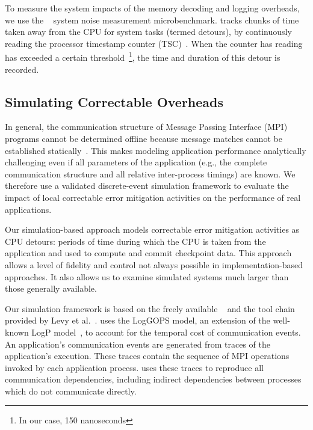To measure the system impacts of the memory decoding and logging overheads, we
use the \selfish~\cite{Hoefler:2010:Characterizing} system noise measurement
microbenchmark. \selfish tracks chunks of time taken away from the CPU for
system tasks (termed detours), by continuously reading the processor timestamp
counter (TSC)~\cite{IntelGuide}.  When the counter has reading has exceeded a
certain threshold~\footnote{In our case, 150 nanoseconds}, the time and duration
of this detour is recorded.

\subsection{Simulating Correctable Overheads}

In general, the communication structure of Message Passing Interface (MPI)
programs cannot be determined offline because message matches cannot be
established statically~\cite{bronevetsky2009communication}.  This makes
modeling application performance analytically challenging even if all
parameters of the application (e.g., the complete communication structure and
all relative inter-process timings) are known.  We therefore use a validated
discrete-event simulation framework to evaluate the impact of local
correctable error mitigation activities on the performance of real applications.

Our simulation-based approach models correctable error mitigation activities as
CPU detours: periods of time during which the CPU is taken from the application
and used to compute and commit checkpoint data.  This approach allows a level of
fidelity and control not always possible in implementation-based approaches. It
also allows us to examine simulated systems much larger than those generally
available.

Our simulation framework is based on the freely available
\LogGOPSim~\cite{Hoefler:2010:LogGOPSim} and the tool chain provided  by Levy et
al.~\cite{Levy2013UsingSimulation}.  \LogGOPSim uses the LogGOPS model, an
extension of the well-known LogP model~\cite{Culler:1993:LogP}, to account for
the temporal cost of communication events.  An application's communication
events are generated from traces of the application's execution.  These traces
contain the sequence of MPI operations invoked by each application process.
\LogGOPSim uses these traces to reproduce all communication dependencies,
including indirect dependencies between processes which do not communicate
directly.


